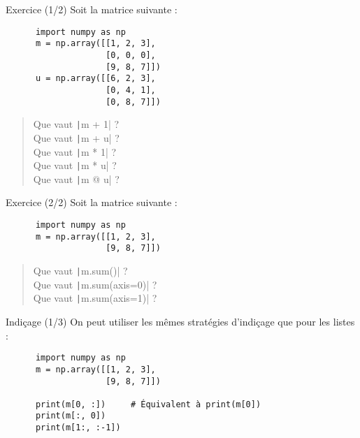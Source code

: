 \documentclass[10pt]{beamer}
\begin{document}
\begin{frame}[fragile]{Exercice (1/2)}
  Soit la matrice suivante :

  \begin{beamercodeblock}
    \begin{verbatim}
      import numpy as np
      m = np.array([[1, 2, 3],
                    [0, 0, 0],
                    [9, 8, 7]])
      u = np.array([[6, 2, 3],
                    [0, 4, 1],
                    [0, 8, 7]])
    \end{verbatim}
  \end{beamercodeblock}

  \bigskip

  \begin{quote}
    Que vaut \texttt|m + 1| ? \\
    Que vaut \texttt|m + u| ? \\
    Que vaut \texttt|m * 1| ? \\
    Que vaut \texttt|m * u| ? \\
    Que vaut \texttt|m @ u| ?
  \end{quote}
\end{frame}

\begin{frame}[fragile]{Exercice (2/2)}
  Soit la matrice suivante :

  \begin{beamercodeblock}
    \begin{verbatim}
      import numpy as np
      m = np.array([[1, 2, 3],
                    [9, 8, 7]])
    \end{verbatim}
  \end{beamercodeblock}

  \bigskip

  \begin{quote}
    Que vaut \texttt|m.sum()| ? \\
    Que vaut \texttt|m.sum(axis=0)| ? \\
    Que vaut \texttt|m.sum(axis=1)| ?
  \end{quote}
\end{frame}

\begin{frame}[fragile]{Indiçage (1/3)}
  On peut utiliser les mêmes stratégies d'indiçage que pour les listes : 

  \begin{beamercodeblock}
    \begin{verbatim}
      import numpy as np
      m = np.array([[1, 2, 3],
                    [9, 8, 7]])

      print(m[0, :])     # Équivalent à print(m[0])
      print(m[:, 0])
      print(m[1:, :-1])
    \end{verbatim}
  \end{beamercodeblock}
\end{frame}
\end{document}
